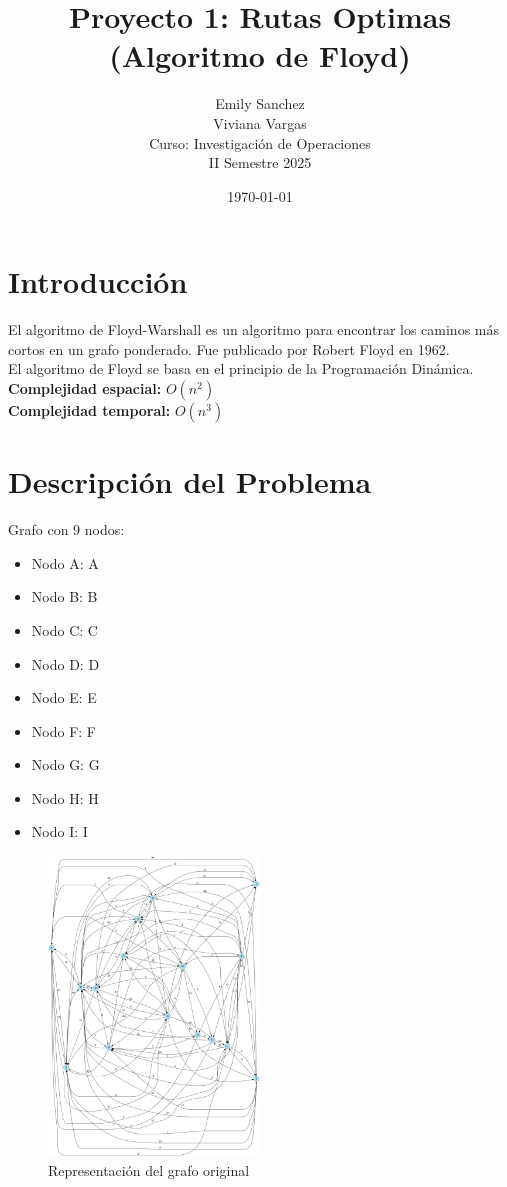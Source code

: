 \documentclass[12pt]{article}
\title{Proyecto 1: Rutas Optimas (Algoritmo de Floyd)}
\author{Emily Sanchez \\ Viviana Vargas \\[1cm] Curso: Investigación de Operaciones \\ II Semestre 2025}
\date{\today}
\begin{document}
\maketitle
\thispagestyle{empty}
\newpage
\setcounter{page}{1}

\section{Introducción}
El algoritmo de Floyd-Warshall es un algoritmo para encontrar los caminos más cortos en un grafo ponderado. Fue publicado por Robert Floyd en 1962.\\
El algoritmo de Floyd se basa en el principio de la Programación Dinámica.\\
\textbf{Complejidad espacial:} $O(n^2)$\\
\textbf{Complejidad temporal:} $O(n^3)$\\
\clearpage
\section{Descripción del Problema}
Grafo con 9 nodos:

\begin{itemize}
\item Nodo A: A
\item Nodo B: B
\item Nodo C: C
\item Nodo D: D
\item Nodo E: E
\item Nodo F: F
\item Nodo G: G
\item Nodo H: H
\item Nodo I: I
\end{itemize}

\begin{figure}[h!]
\centering
\includegraphics[width=0.5\textwidth,keepaspectratio]{grafo.png}
\caption{Representación del grafo original}
\end{figure}
\end{document}
